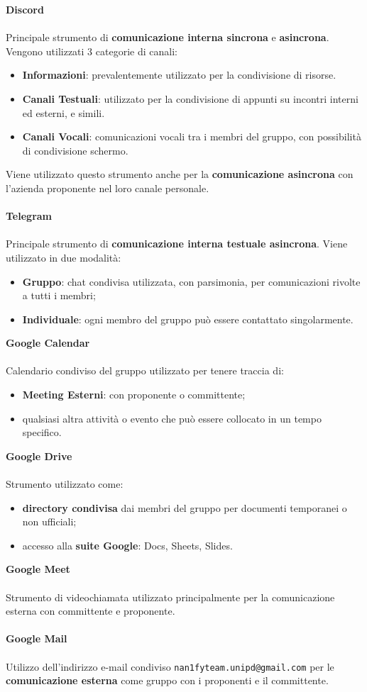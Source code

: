 \textbf{Discord}\\\\
Principale strumento di \textbf{comunicazione interna sincrona} e \textbf{asincrona}. Vengono utilizzati 3 categorie di canali:
\begin{itemize}
  \item \textbf{Informazioni}: prevalentemente utilizzato per la condivisione di risorse.
  \item \textbf{Canali Testuali}: utilizzato per la condivisione di appunti su incontri interni ed esterni, e simili.
  \item \textbf{Canali Vocali}: comunicazioni vocali tra i membri del gruppo, con possibilità di condivisione schermo.
\end{itemize}
\medskip
Viene utilizzato questo strumento anche per la \textbf{comunicazione asincrona} con l'azienda proponente nel loro canale personale.
\\\\
\textbf{Telegram}\\\\
Principale strumento di \textbf{comunicazione interna testuale asincrona}. Viene utilizzato in due modalità:
\begin{itemize}
  \item \textbf{Gruppo}: chat condivisa utilizzata, con parsimonia, per comunicazioni rivolte a tutti i membri;
  \item \textbf{Individuale}: ogni membro del gruppo può essere contattato singolarmente.
\end{itemize}
\medskip
\textbf{Google Calendar}\\\\
Calendario condiviso del gruppo utilizzato per tenere traccia di:
\begin{itemize}
  \item \textbf{Meeting Esterni}: con proponente o committente;
  \item qualsiasi altra attività o evento che può essere collocato in un tempo specifico.
\end{itemize}
\medskip
\textbf{Google Drive}\\\\
Strumento utilizzato come:
\begin{itemize}
  \item \textbf{directory condivisa} dai membri del gruppo per documenti temporanei o non ufficiali;
  \item accesso alla \textbf{suite Google}: Docs, Sheets, Slides.
\end{itemize}
\medskip
\textbf{Google Meet}\\\\
Strumento di videochiamata utilizzato principalmente per la comunicazione esterna con committente e proponente.
\\\\
\textbf{Google Mail}\\\\
Utilizzo dell'indirizzo e-mail condiviso \texttt{nan1fyteam.unipd@gmail.com} per le \textbf{comunicazione esterna} come gruppo con i proponenti e il committente.

